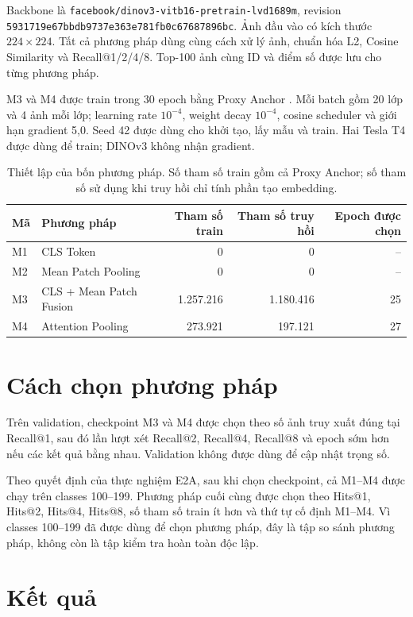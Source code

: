 \documentclass[11pt,a4paper]{article}
\begin{document}
Backbone là \texttt{facebook/dinov3-vitb16-pretrain-lvd1689m}, revision
\texttt{5931719e67bbdb9737e363e781fb0c67687896bc}. Ảnh đầu vào có kích thước
$224\times224$. Tất cả phương pháp dùng cùng cách xử lý ảnh, chuẩn hóa L2,
Cosine Similarity và Recall@1/2/4/8. Top-100 ảnh cùng ID và điểm số được lưu
cho từng phương pháp.

M3 và M4 được train trong 30 epoch bằng Proxy Anchor
\cite{kim2020proxyanchor}. Mỗi batch gồm 20 lớp và 4 ảnh mỗi lớp; learning
rate $10^{-4}$, weight decay $10^{-4}$, cosine scheduler và giới hạn gradient
5,0. Seed 42 được dùng cho khởi tạo, lấy mẫu và train. Hai Tesla T4 được dùng
để train; DINOv3 không nhận gradient.

\begin{table}[htbp]
\centering
\caption{Thiết lập của bốn phương pháp. Số tham số train gồm cả Proxy Anchor;
số tham số sử dụng khi truy hồi chỉ tính phần tạo embedding.}
\begin{tabular}{@{}llrrr@{}}
\toprule
Mã & Phương pháp & Tham số train & Tham số truy hồi & Epoch được chọn\\
\midrule
M1 & CLS Token & 0 & 0 & --\\
M2 & Mean Patch Pooling & 0 & 0 & --\\
M3 & CLS + Mean Patch Fusion & 1.257.216 & 1.180.416 & 25\\
M4 & Attention Pooling & 273.921 & 197.121 & 27\\
\bottomrule
\end{tabular}
\end{table}

\section{Cách chọn phương pháp}
Trên validation, checkpoint M3 và M4 được chọn theo số ảnh truy xuất đúng tại
Recall@1, sau đó lần lượt xét Recall@2, Recall@4, Recall@8 và epoch sớm hơn
nếu các kết quả bằng nhau. Validation không được dùng để cập nhật trọng số.

Theo quyết định của thực nghiệm E2A, sau khi chọn checkpoint, cả M1--M4 được
chạy trên classes 100--199. Phương pháp cuối cùng được chọn theo Hits@1,
Hits@2, Hits@4, Hits@8, số tham số train ít hơn và thứ tự cố định M1--M4.
Vì classes 100--199 đã được dùng để chọn phương pháp, đây là tập so sánh
phương pháp, không còn là tập kiểm tra hoàn toàn độc lập.

\section{Kết quả}
\end{document}
